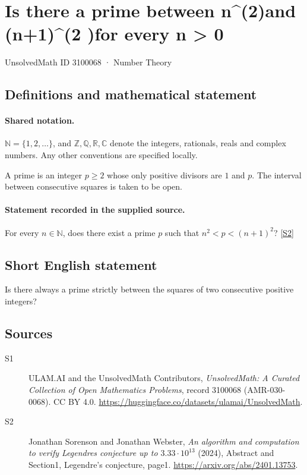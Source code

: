 \documentclass[11pt]{article}
\newcommand{\sref}[2]{\hyperlink{source:#1:#2}{[S#2]}}
\begin{document}
\setcounter{section}{3100067}
\section{Is there a prime between n\textasciicircum{}(2)and (n+1)\textasciicircum{}(2 )for every n > 0}\label{3100068}
{\small\sffamily UnsolvedMath ID 3100068 · Number Theory}
\subsection{Definitions and mathematical statement}

\paragraph{Shared notation.}$\mathbb N=\{1,2,\ldots\}$, and $\mathbb Z,\mathbb Q,\mathbb R,\mathbb C$ denote the integers, rationals, reals and complex numbers. Any other conventions are specified locally.


A prime is an integer $p\ge2$ whose only positive divisors are $1$ and $p$. The interval between consecutive squares is taken to be open.

\paragraph{Statement recorded in the supplied source.}
For every $n\in\mathbb N$, does there exist a prime $p$ such that $n^2<p<(n+1)^2$? \sref{3100068}{2}

\subsection{Short English statement}
Is there always a prime strictly between the squares of two consecutive positive integers?
\subsection{Sources}
\begin{description}
\item[\hypertarget{source:3100068:1}{S1}] ULAM.AI and the UnsolvedMath Contributors, \emph{UnsolvedMath: A Curated Collection of Open Mathematics Problems}, record 3100068 (AMR-030-0068). CC BY 4.0. \url{https://huggingface.co/datasets/ulamai/UnsolvedMath}.
\item[\hypertarget{source:3100068:2}{S2}] Jonathan Sorenson and Jonathan Webster, \emph{An algorithm and computation to verify Legendre\textquotesingle s conjecture up to $3.33\cdot10^{13}$} (2024), Abstract and Section1, Legendre’s conjecture, page1. \url{https://arxiv.org/abs/2401.13753}.
\end{description}
\label{end:3100068}
\end{document}

